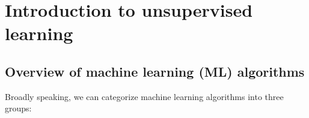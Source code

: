 \documentclass{scrartcl}
\begin{document}
    
    \maketitle
    \tableofcontents
    
    

    
    \hypertarget{introduction-to-unsupervised-learning}{%
\section{Introduction to unsupervised
learning}\label{introduction-to-unsupervised-learning}}

    \hypertarget{overview-of-machine-learning-ml-algorithms}{%
\subsection{Overview of machine learning (ML)
algorithms}\label{overview-of-machine-learning-ml-algorithms}}

Broadly speaking, we can categorize machine learning algorithms into
three groups:
\end{document}
